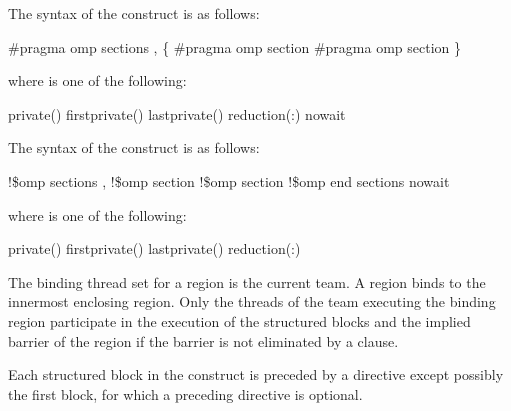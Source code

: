 \syntax
\ccppspecificstart
The syntax of the  construct is as follows:

\begin{boxedcode}
\#pragma omp sections \plc{[clause[ [},\plc{] clause] ... ] new-line}
   \{
   \plc{[}\#pragma omp section \plc{]}
   \plc{[}\#pragma omp section 
      \plc{structured-block]}
   \}
\end{boxedcode}

where  is one of the following: 

\begin{indentedcodelist}
private()
firstprivate()
lastprivate()
reduction(:)
nowait
\end{indentedcodelist}
\ccppspecificend

\begin{samepage}
\fortranspecificstart
The syntax of the  construct is as follows:

\begin{boxedcode}
!\$omp sections \plc{[clause[ [},\plc{] clause] ... ]}
   \plc{[}!\$omp section\plc{]}
   \plc{[}!\$omp section
      \plc{structured-block]}
!\$omp end sections \plc{[}nowait\plc{]}
\end{boxedcode}
\end{samepage}

\begin{samepage}
where  is one of the following:

\begin{indentedcodelist}
private()
firstprivate()
lastprivate()
reduction(:)
\end{indentedcodelist}
\fortranspecificend
\end{samepage}

\binding
The binding thread set for a  region is the current team. A  
region binds to the innermost enclosing  region. Only the threads of the team 
executing the binding  region participate in the execution of the structured 
blocks and the implied barrier of the  region if the barrier is not eliminated 
by a  clause.

\descr
Each structured block in the  construct is preceded by a  directive 
except possibly the first block, for which a preceding  directive is optional.

